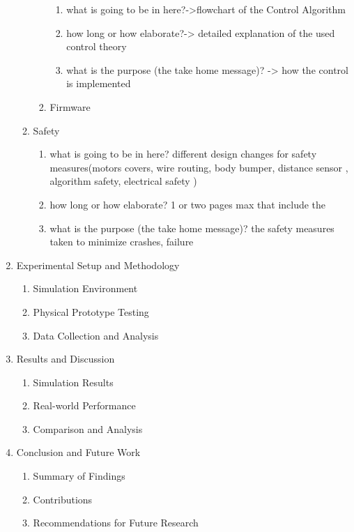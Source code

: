 \begin{enumerate}
\begin{enumerate}
\begin{enumerate}
			\begin{enumerate}
				\item what is going to be in here?->flowchart of the Control Algorithm
				\item how long or how elaborate?-> detailed explanation of the used control theory
				\item what is the purpose (the take home message)? -> how the control is implemented
			\end{enumerate}
			\item Firmware
		\end{enumerate}
		\item Safety
		\begin{enumerate}
			\item what is going to be in here? different design changes for safety measures(motors covers, wire routing, body bumper, distance sensor , algorithm safety, electrical safety )
			\item how long or how elaborate? 1 or two pages max that include the
			\item what is the purpose (the take home message)? the safety measures taken to minimize crashes, failure
		\end{enumerate}
	\end{enumerate}
	\item Experimental Setup and Methodology
	\begin{enumerate}
		\item Simulation Environment
		\item Physical Prototype Testing
		\item Data Collection and Analysis
	\end{enumerate}
	\item Results and Discussion
	\begin{enumerate}
		\item Simulation Results
		\item Real-world Performance
		\item Comparison and Analysis
	\end{enumerate}
	\item Conclusion and Future Work
	\begin{enumerate}
		\item Summary of Findings
		\item Contributions
		\item Recommendations for Future Research
	\end{enumerate}
\end{enumerate}


